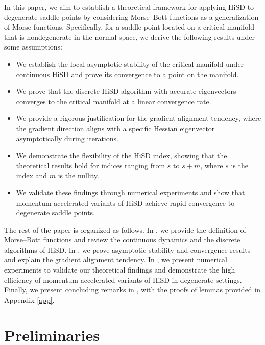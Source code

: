 \documentclass[final]{siamart251216}
\begin{document}
In this paper, we aim to establish a theoretical framework for applying HiSD to degenerate saddle points by considering Morse--Bott functions as a generalization of Morse functions. 
Specifically, for a saddle point located on a critical manifold that is nondegenerate in the normal space, we derive the following results under some assumptions:
\begin{itemize}
\item We establish the local asymptotic stability of the critical manifold under continuous HiSD and prove its convergence to a point on the manifold.
\item We prove that the discrete HiSD algorithm with accurate eigenvectors converges to the critical manifold at a linear convergence rate. 
\item We provide a rigorous justification for the gradient alignment tendency, where the gradient direction aligns with a specific Hessian eigenvector asymptotically during iterations.
\item We demonstrate the flexibility of the HiSD index, showing that the theoretical results hold for indices ranging from $s$ to $s+m$, where $s$ is the index and $m$ is the nullity.
\item We validate these findings through numerical experiments and show that momentum-accelerated variants of HiSD achieve rapid convergence to degenerate saddle points.
\end{itemize}

The rest of the paper is organized as follows. 
In , we provide the definition of Morse--Bott functions and review the continuous dynamics and the discrete algorithms of HiSD.
In , we prove asymptotic stability and convergence results and explain the gradient alignment tendency.
In , we present numerical experiments to validate our theoretical findings and demonstrate the high efficiency of momentum-accelerated variants of HiSD in degenerate settings. 
Finally, we present concluding remarks in , with the proofs of lemmas provided in Appendix \ref{app}.


\section{Preliminaries} \label{sec:2}
\end{document}
